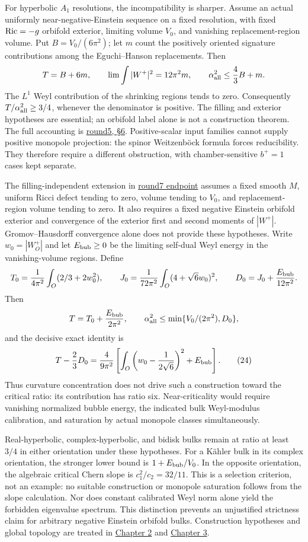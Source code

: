 \documentclass[
  english,
]{article}
\begin{document}
For hyperbolic \(A_1\) resolutions, the incompatibility is sharper.
Assume an actual uniformly near-negative-Einstein sequence on a fixed
resolution, with fixed \({\rm Ric}=-g\) orbifold exterior, limiting
volume \(V_0\), and vanishing replacement-region volume. Put
\(B=V_0/(6\pi^2)\); let \(m\) count the positively oriented signature
contributions among the Eguchi--Hanson replacements. Then \[
 T=B+6m,\qquad
 \lim\int|W^+|^2=12\pi^2m,\qquad
             \alpha_{\rm all}^2\le\frac43B+m .
\] The \(L^1\) Weyl contribution of the shrinking regions tends to zero.
Consequently \(T/\alpha_{\rm all}^2\ge3/4\), whenever the denominator is
positive. The filling and exterior hypotheses are essential; an orbifold
label alone is not a construction theorem. The full accounting is
\href{../proofs/round5_rigidity.md}{round5, §6}. Positive-scalar input
families cannot supply positive monopole projection: the spinor
Weitzenböck formula forces reducibility. They therefore require a
different obstruction, with chamber-sensitive \(b^+=1\) cases kept
separate.

The filling-independent extension in
\href{../proofs/round7_endpoint.md}{round7 endpoint} assumes a fixed
smooth \(M\), uniform Ricci defect tending to zero, volume tending to
\(V_0\), and replacement-region volume tending to zero. It also requires
a fixed negative Einstein orbifold exterior and convergence of the
exterior first and second moments of \(|W^+|\). Gromov--Hausdorff
convergence alone does not provide these hypotheses. Write
\(w_0=|W_O^+|\) and let \(E_{\rm bub}\ge0\) be the limiting self-dual
Weyl energy in the vanishing-volume regions. Define \[
 T_0=\frac1{4\pi^2}\int_O(2/3+2w_0^2),\qquad
 J_0=\frac1{72\pi^2}\int_O(4+\sqrt6w_0)^2,\qquad
 D_0=J_0+\frac{E_{\rm bub}}{12\pi^2}.
\] Then \[
 T=T_0+\frac{E_{\rm bub}}{2\pi^2},\qquad
 \alpha_{\rm all}^2\le
       \min\{V_0/(2\pi^2),D_0\},
\] and the decisive exact identity is \[
 T-\frac23D_0=
   \frac4{9\pi^2}
     \left[\int_O\left(w_0-\frac1{2\sqrt6}\right)^2+E_{\rm bub}\right].
                                                               \tag{24}
\] Thus curvature concentration does not drive such a construction
toward the critical ratio: its contribution has ratio six.
Near-criticality would require vanishing normalized bubble energy, the
indicated bulk Weyl-modulus calibration, and saturation by actual
monopole classes simultaneously.

Real-hyperbolic, complex-hyperbolic, and bidisk bulks remain at ratio at
least \(3/4\) in either orientation under these hypotheses. For a Kähler
bulk in its complex orientation, the stronger lower bound is
\(1+E_{\rm bub}/V_0\). In the opposite orientation, the algebraic
critical Chern slope is \(c_1^2/c_2=32/11\). This is a selection
criterion, not an example: no suitable construction or monopole
saturation follows from the slope calculation. Nor does constant
calibrated Weyl norm alone yield the forbidden eigenvalue spectrum. This
distinction prevents an unjustified strictness claim for arbitrary
negative Einstein orbifold bulks. Construction hypotheses and global
topology are treated in \href{02_constructions.md}{Chapter 2} and
\href{03_global.md}{Chapter 3}.
\end{document}
